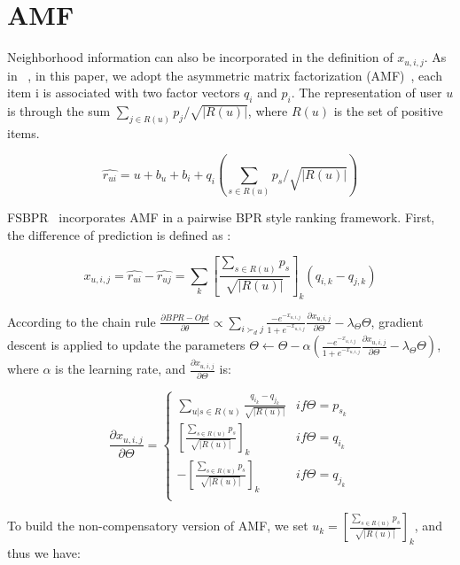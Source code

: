 \documentclass[11pt]{report}
\begin{document}
 \section{AMF}
 
Neighborhood information can also be incorporated in the definition of $x_{u,i,j}$. As in ~\cite{Steck2015Gaussian}, in this paper, we adopt the asymmetric matrix factorization (AMF)~\cite{Steck2015Gaussian}, each item i is associated with two factor vectors $q_i$ and $p_i$. The representation of user $u$ is through the sum $\sum_{j \in R(u)} p_j/\sqrt{|R(u)|}$, where $R(u)$ is the set of positive items.  
 
  \begin{equation}
\hat{r_{ui}}=u+b_u+b_i+q_i (\sum_{s \in R(u)} p_s/\sqrt{|R(u)|} )
\end{equation}

FSBPR~\cite{Zhao2018Factored} incorporates AMF in a pairwise BPR style ranking framework. First, the difference of prediction is defined as :
 
\begin{equation}
x_{u,i,j} = \hat{r_{ui}}- \hat{r_{uj}} = \sum_k [\frac{\sum_{s \in R(u)}  p_s}{\sqrt{|R(u)|}}]_k (q_{i,k}-q_{j,k})
\end{equation}

According to the chain rule $\frac{\partial BPR-Opt}{\partial \theta}\propto \sum_{i\succ_d j} \frac{-e^{-x_{u,i,j}}}{1+ e^{-x_{u,i,j}} } \frac{\partial x_{u,i,j}}{\partial \Theta} -\lambda_\Theta \Theta$, gradient descent is applied to update the parameters $\Theta \leftarrow \Theta - \alpha (\frac{-e^{-x_{u,i,j}}}{1+ e^{-x_{u,i,j}} } \frac{\partial x_{u,i,j}}{\partial \Theta} -\lambda_\Theta \Theta)$, where $\alpha$ is the learning rate, and $ \frac{\partial x_{u,i,j}}{\partial \Theta}$ is:


\begin{equation}\label{equ:BPR}
 \frac{\partial x_{u,i,j}}{\partial \Theta}=\left\{\begin{matrix}
\sum_{u | s\in R(u) }\frac{q_{i_k}-q_{j_k}} {\sqrt{|R(u)|} } & if \Theta=p_{s _k} \\ 
[\frac{\sum_{s \in R(u)}  p_s}{\sqrt{|R(u)|}}]_k   & if \Theta= q_{i_k} \\ 
-[\frac{\sum_{s \in R(u)}  p_s}{\sqrt{|R(u)|}}]_k  & if \Theta= q_{j_k} \\ 
\end{matrix}\right.
\end{equation}

To build the non-compensatory version of AMF, we set $u_k = [\frac{\sum_{s \in R(u)}  p_s}{\sqrt{|R(u)|}}]_k$, and thus we have:
\end{document}
